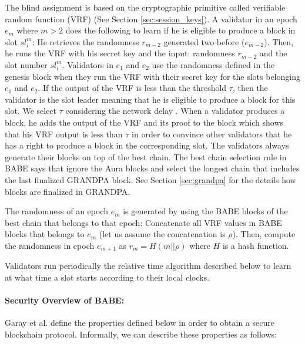 The blind assignment is based on the cryptographic primitive called verifiable random function (VRF) \cite{vrf} (See Section \ref{sec:session_keys}). 
A validator in an epoch $e_m$ where $m > 2$ does the following to learn if he is eligible to produce a block in slot $sl_i^m$: He retrieves the randomness $r_{m-2}$ generated two  before ($e_{m-2}$). Then, he runs the VRF with his secret key and the input:  randomness $r_{m-2}$ and the slot number $ sl_i^m $.  Validators in $e_1$ and $e_2$ use the randomness defined in the genesis block when they run the VRF with their secret key for the slots belonging $e_1$ and $e_2$. If the output of the VRF is less than the threshold $ \tau $, then the validator is the slot leader meaning that he is eligible to produce a block for this slot. We select $\tau$ considering the network delay \cite{babe}. 
When a validator produces a block, he adds the output of the VRF and its proof to the block which shows that his VRF output is less than $\tau$  in order to convince other validators that he has a right to produce a block in the corresponding slot. The validators always generate their blocks on top of the best chain.
The best chain selection rule in BABE says that ignore the Aura blocks and select the longest chain that includes the last finalized GRANDPA block. See Section \ref{sec:grandpa} for the details how blocks are finalized in GRANDPA.

The randomness of an epoch $e_m$ is generated by using the BABE blocks of the best chain that belongs to that epoch: Concatenate all  VRF values in BABE blocks that belongs to $e_m$  (let us assume  the concatenation is \(\rho\)). Then, compute the randomness in epoch $e_{m+1}$ as $r_{m} = H(m
||\rho)$ where $ H $ is a hash function. 

Validators run periodically the relative time algorithm described below to learn  at what time a slot starts according to their local clocks.




\paragraph{ Security Overview of BABE:} Garay et al. \cite{backbone} define the properties defined below in order to obtain a secure blockchain protocol. Informally, we can describe these properties as follows:

